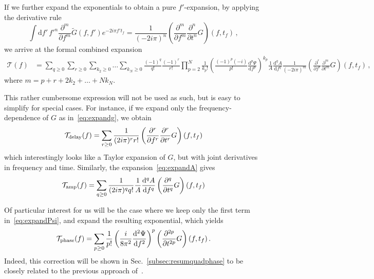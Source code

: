 \documentclass[aps,showpacs,twocolumn,
prd,superscriptaddress,nofootinbib]{revtex4-1}
\newcommand{\be}{\begin{equation}}
\newcommand{\ee}{\end{equation}}
\newcommand\ud{{\mathrm{d}}}
\newcommand\calT{{\mathcal{T}}}
\newcommand{\tf}{t_{f}}
\begin{document}
\begin{widetext}
If we further expand the exponentials to obtain a pure $f'$-expansion, by applying the derivative rule
\allowdisplaybreaks
\be
	\int \ud f'\, {f'}^{n} \frac{\partial^{m} }{\partial f^{m}}  \tilde{G}(f,f') e^{-2i\pi f' \tf} = \frac{1}{(-2i\pi)^{n}} \left( \frac{\partial^{m} }{\partial f^{m}} \frac{\partial^{n} }{\partial t^{n}} G \right)(f,\tf) \,,
\ee
we arrive at the formal combined expansion
\begin{align}
	\calT(f) &= \sum\limits_{q\geq 0} \sum\limits_{r\geq 0} \sum\limits_{k_{2}\geq 0} \dots \sum\limits_{k_{N}\geq 0} \frac{(-1)^{q}}{q!} \frac{(-1)^{r}}{r!} \prod\limits_{p=2}^{N} \frac{1}{k_{p}!}\left( \frac{(-1)^{p}(-i)}{p!} \frac{\ud^{p}\Psi}{\ud f^{p}}\right)^{k_{p}} \frac{1}{A} \frac{\ud^{q} A}{\ud f ^{q}} \frac{1}{(-2i\pi)^m} \left( \frac{\partial^{r} }{\partial f^{r}} \frac{\partial^{m} }{\partial t^{m}} G \right)(f,\tf) \,,
\end{align}
where $m = p+r+2k_{2}+\dots+N k_{N}$.
\end{widetext}

This rather cumbersome expression will not be used as such, but is easy to simplify for special cases. For instance, if we expand only the frequency-dependence of $G$ as in~\eqref{eq:expandg}, we obtain
\be\label{eq:taylordelay}
	\calT_{\rm delay}(f) = \sum\limits_{r\geq 0} \frac{1}{(2i\pi)^{r}r!} \left( \frac{\partial^{r} }{\partial f^{r}} \frac{\partial^{r} }{\partial t^{r}} G \right)(f,\tf)
\ee
which interestingly looks like a Taylor expansion of $G$, but with joint derivatives in frequency and time. Similarly, the expansion~\eqref{eq:expandA} gives
\be\label{eq:resultdfA}
	\calT_{\rm amp}(f) = \sum\limits_{q\geq 0} \frac{1}{(2i\pi)^{q}q!} \frac{1}{A} \frac{\ud^{q} A}{\ud f ^{q}}  \left( \frac{\partial^{q} }{\partial t^{q}} G \right)(f,\tf)
\ee

Of particular interest for us will be the case where we keep only the first term in~\eqref{eq:expandPsi}, and expand the resulting exponential, which yields
\be\label{eq:resultdffPsi}
	\calT_{\rm phase}(f) = \sum\limits_{p\geq 0} \frac{1}{p!} \left( \frac{i}{8\pi^{2}}\frac{\ud^{2} \Psi}{\ud f^{2}} \right)^{p} \left( \frac{\partial^{2p} }{\partial t^{2p}} G \right)(f, \tf) \,.
\ee
Indeed, this correction will be shown in Sec.~\ref{subsec:resumquadphase} to be closely related to the previous approach of~\cite{KCY14}.
\end{document}
